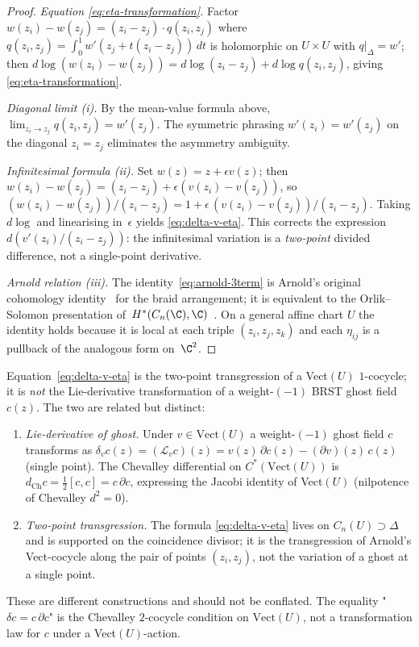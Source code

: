 \begin{proof}
\emph{Equation \eqref{eq:eta-transformation}.} Factor
$w(z_i) - w(z_j) = (z_i - z_j) \cdot q(z_i, z_j)$ where
$q(z_i, z_j) = \int_0^1 w'(z_j + t(z_i - z_j))\,dt$ is holomorphic on
$U \times U$ with $q|_{\Delta} = w'$; then
$d\log(w(z_i) - w(z_j)) = d\log(z_i - z_j) + d\log q(z_i, z_j)$,
giving \eqref{eq:eta-transformation}.

\emph{Diagonal limit (i).} By the mean-value formula above,
$\lim_{z_i \to z_j} q(z_i,z_j) = w'(z_j)$. The symmetric phrasing
$w'(z_i) = w'(z_j)$ on the diagonal $z_i = z_j$ eliminates the
asymmetry ambiguity.

\emph{Infinitesimal formula (ii).} Set $w(z) = z + \epsilon v(z)$;
then $w(z_i) - w(z_j) = (z_i - z_j) + \epsilon(v(z_i) - v(z_j))$, so
$(w(z_i) - w(z_j))/(z_i - z_j) = 1 + \epsilon\,(v(z_i) - v(z_j))/(z_i - z_j)$.
Taking $d\log$ and linearising in~$\epsilon$ yields
\eqref{eq:delta-v-eta}. This corrects the expression
$d(v'(z_i)/(z_i - z_j))$: the
infinitesimal variation is a \emph{two-point} divided difference,
not a single-point derivative.

\emph{Arnold relation (iii).} The identity~\eqref{eq:arnold-3term}
is Arnold's original cohomology identity~\cite{Arnold69}
for the braid arrangement; it is equivalent to the Orlik--Solomon
presentation of~$H^{*}(C_n(\C),\C)$~\cite{OrlSol80}.
On a general affine chart $U$ the identity holds because it is
local at each triple $(z_i, z_j, z_k)$ and each $\eta_{ij}$ is a
pullback of the analogous form on~$\C^2$.
\end{proof}

\begin{remark}
\label{rem:log-form-ghost-scope}
Equation~\eqref{eq:delta-v-eta} is the two-point transgression of
a Vect$(U)$ $1$-cocycle; it is \emph{not} the Lie-derivative
transformation of a weight-$(-1)$ BRST ghost field $c(z)$. The
two are related but distinct:
\begin{enumerate}[label=\textup{(\alph*)}]
\item \emph{Lie-derivative of ghost.} Under $v \in \mathrm{Vect}(U)$
a weight-$(-1)$ ghost field $c$ transforms as
$\delta_v c(z) = (\mathcal{L}_v c)(z) = v(z)\,\partial c(z) -
(\partial v)(z)\,c(z)$ (single point). The Chevalley differential
on $C^{*}(\mathrm{Vect}(U))$ is
$d_{\mathrm{Ch}} c = \tfrac{1}{2}[c, c] = c\,\partial c$, expressing
the Jacobi identity of Vect$(U)$ (nilpotence of Chevalley $d^{2} = 0$).
\item \emph{Two-point transgression.} The formula
\eqref{eq:delta-v-eta} lives on $C_n(U) \supset \Delta$ and is
supported on the coincidence divisor; it is the transgression of
Arnold's Vect-cocycle along the pair of points $(z_i, z_j)$, not
the variation of a ghost at a single point.
\end{enumerate}
These are different constructions and should not be conflated.
The equality "$\delta c = c\,\partial c$" is the Chevalley
$2$-cocycle condition on $\mathrm{Vect}(U)$, not a transformation
law for $c$ under a Vect$(U)$-action.
\end{remark}

